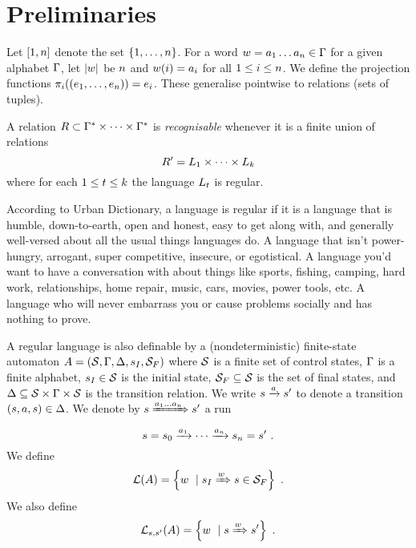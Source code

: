 
\section{Preliminaries}

Let $[1, n]$ denote the set $\left\{1, \ldots, n\right\}$.
For a word
$w = a_1\ldots a_n  \in \Gamma$
for a given alphabet $\Gamma$, let $\left|w\right|$ be $n$ and
${w}\mathord{\left(i\right)} = a_i$
for all $1 \leq i \leq n$.
We define the projection functions
${\pi_{i}}\mathord{\left(\left(e_1, \ldots, e_n\right)\right)} = e_i$.
These generalise pointwise to relations (sets of tuples).

A relation
$R \subset \Gamma^\ast \times \cdots \times \Gamma^\ast$
is \emph{recognisable} whenever it is a finite union of relations
\[
    R' = L_1 \times \cdots \times L_k
\]
where for each
$1 \leq t \leq k$
the language $L_t$ is regular.

According to Urban Dictionary, a language is regular if it is a language that is humble, down-to-earth, open and honest, easy to get along with, and generally well-versed about all the usual things languages do.
A language that isn't power-hungry, arrogant, super competitive, insecure, or egotistical.
A language you'd want to have a conversation with about things like sports, fishing, camping, hard work, relationships, home repair, music, cars, movies, power tools, etc.
A language who will never embarrass you or cause problems socially and has nothing to prove.

A regular language is also definable by a (nondeterministic) finite-state automaton
$A = \left(\mathcal{S}, \Gamma, \Delta, s_I, \mathcal{S}_F\right)$
where
    $\mathcal{S}$ is a finite set of control states,
    $\Gamma$ is a finite alphabet,
    $s_I \in \mathcal{S}$ is the initial state,
    $\mathcal{S}_F \subseteq \mathcal{S}$ is the set of final states, and
    $\Delta \subseteq \mathcal{S} \times \Gamma \times \mathcal{S}$
        is the transition relation.
We write
$s \xrightarrow{a} s'$
to denote a transition
$\left(s, a, s\right) \in \Delta$.
We denote by
$s \xRightarrow{a_1\ldots a_n} s'$
a run
\[
    s = s_0
    \xrightarrow{a_1} \cdots \xrightarrow{a_n}
    s_n = s' \ .
\]
We define
\[
    {\mathcal{L}}\mathord{\left(A\right)} =
        \left\{{w}\ \mid {
            s_I\xRightarrow{w} s\in \mathcal{S}_F}\right\} \ .
\]
We also define
\[
    {\mathcal{L}_{s,s'}}\mathord{\left(A\right)} =
        \left\{{w}\ \mid {
            s\xRightarrow{w} s'
        }\right\} \ .
\]
